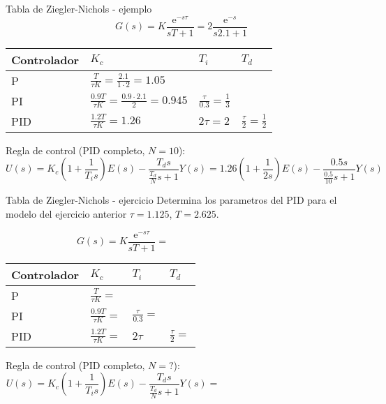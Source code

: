 \documentclass[presentation,aspectratio=1610]{beamer}
\begin{document}
\begin{frame}[label={sec:orge88f07e}]{Tabla de  Ziegler-Nichols - ejemplo}
\[ G(s) = K \frac{\mathrm{e}^{-s\tau}}{sT + 1} = 2 \frac{\mathrm{e}^{-s}}{s2.1 + 1} \]
   \begin{center}
   \setlength{\tabcolsep}{20pt}
   \renewcommand{\arraystretch}{1.5}
   \begin{tabular}{llll}
   Controlador & \(K_c\) & \(T_i\) & \(T_d\)\\
  \hline\hline
  P & \(\frac{T}{\tau K} = \frac{2.1}{1 \cdot 2} = 1.05\) &  & \\
  PI & \(\frac{0.9T}{\tau K} = \frac{0.9\cdot 2.1}{2}= 0.945\) & \(\frac{\tau}{0.3} = \frac{1}{3} \) & \\
  PID & \(\frac{1.2T}{\tau K} = 1.26 \) & \(2\tau=2\) & \(\frac{\tau}{2}=\frac{1}{2}\)\\
  \hline
\end{tabular}
\end{center}
Regla de control (PID completo, \(N=10\)):
\[ U(s) = K_c\left( 1 + \frac{1}{T_i s} \right) E(s) - \frac{T_d s}{\frac{T_d}{N} s + 1}Y(s)
           =  1.26\left( 1 + \frac{1}{2 s} \right) E(s) - \frac{0.5s}{\frac{0.5}{10} s + 1}Y(s)\]
\end{frame}


\begin{frame}[label={sec:orgedbe0f8}]{Tabla de  Ziegler-Nichols - ejercicio}
Determina los parametros del PID para el modelo del ejercicio anterior \(\tau = 1.125\), \(T = 2.625\).

\[ G(s) = K \frac{\mathrm{e}^{-s\tau}}{sT + 1} =  \qquad\qquad\qquad\qquad\qquad\qquad \]
   \begin{center}
   \setlength{\tabcolsep}{20pt}
   \renewcommand{\arraystretch}{1.5}
   \begin{tabular}{llll}
   Controlador & \(K_c\) & \(T_i\) & \(T_d\)\\
  \hline\hline
  P & \(\frac{T}{\tau K} = \) &  & \\
  PI & \(\frac{0.9T}{\tau K} = \) & \(\frac{\tau}{0.3} = \) & \\
  PID & \(\frac{1.2T}{\tau K} = \) & \(2\tau\) & \(\frac{\tau}{2}=\)\\
  \hline
\end{tabular}
\end{center}
Regla de control (PID completo, \(N=?\)):
\[ U(s) = K_c\left( 1 + \frac{1}{T_i s} \right) E(s) - \frac{T_d s}{\frac{T_d}{N} s + 1}Y(s)
           =  \qquad\qquad\qquad\qquad\qquad\qquad\quad\quad\]
\end{frame}
\end{document}
